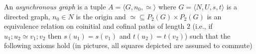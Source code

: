 \begin{definition}
  \label{de:async-graph}
  An \emph{asynchronous graph} 
  is a tuple
  $A = \langle G, n_0, \simeq \rangle$ where
  $G = \langle N, U, s, t \rangle$ is a directed graph,
  $n_0 \in N$ is the origin and
  ${\simeq} \subseteq P_2(G) \times P_2(G)$ is an equivalence
  relation
  on coinitial and cofinal paths of length $2$ (i.e., if
  $u_1;u_2 \simeq v_1;v_2$ then $s(u_1)=s(v_1)$ and $t(u_2)=t(v_2)$)
  such that the following axioms hold (in pictures, all squares
  depicted are assumed to commute)
  \begin{enumerate}


\end{enumerate}
\end{definition}

